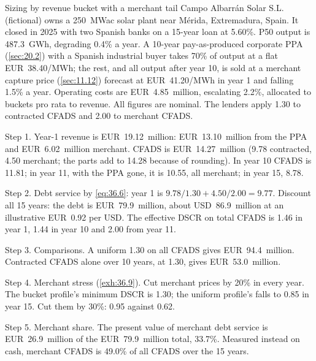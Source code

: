 \begin{example}{Sizing by revenue bucket with a merchant tail \illustrative}\label{ex:36.11}
Campo Albarrán Solar S.L. (fictional) owns a 250~MWac solar plant near Mérida, Extremadura, Spain. It closed in 2025 with two Spanish banks on a 15-year loan at 5.60\%. P50 output is 487.3~GWh, degrading 0.4\% a year. A 10-year pay-as-produced corporate PPA (\cref{sec:20.2}) with a Spanish industrial buyer takes 70\% of output at a flat EUR~38.40/MWh; the rest, and all output after year 10, is sold at a merchant capture price (\cref{sec:11.12}) forecast at EUR~41.20/MWh in year 1 and falling 1.5\% a year. Operating costs are EUR~4.85~million, escalating 2.2\%, allocated to buckets pro rata to revenue. All figures are nominal. The lenders apply 1.30\x{} to contracted CFADS and 2.00\x{} to merchant CFADS.

Step 1. Year-1 revenue is EUR~19.12~million: EUR~13.10~million from the PPA and EUR~6.02~million merchant. CFADS is EUR~14.27~million (9.78 contracted, 4.50 merchant; the parts add to 14.28 because of rounding). In year 10 CFADS is 11.81; in year 11, with the PPA gone, it is 10.55, all merchant; in year 15, 8.78.

Step 2. Debt service by \cref{eq:36.6}: year 1 is $9.78/1.30 + 4.50/2.00 = 9.77$. Discount all 15 years: the debt is EUR~79.9~million, about USD~86.9~million at an illustrative EUR~0.92 per USD. The effective DSCR on total CFADS is 1.46\x{} in year 1, 1.44\x{} in year 10 and 2.00\x{} from year 11.

Step 3. Comparisons. A uniform 1.30\x{} on all CFADS gives EUR~94.4~million. Contracted CFADS alone over 10 years, at 1.30\x, gives EUR~53.0~million.

Step 4. Merchant stress (\cref{exh:36.9}). Cut merchant prices by 20\% in every year. The bucket profile's minimum DSCR is 1.30\x; the uniform profile's falls to 0.85\x{} in year 15. Cut them by 30\%: 0.95\x{} against 0.62\x.

Step 5. Merchant share. The present value of merchant debt service is EUR~26.9~million of the EUR~79.9~million total, 33.7\%. Measured instead on cash, merchant CFADS is 49.0\% of all CFADS over the 15 years.
\end{example}

